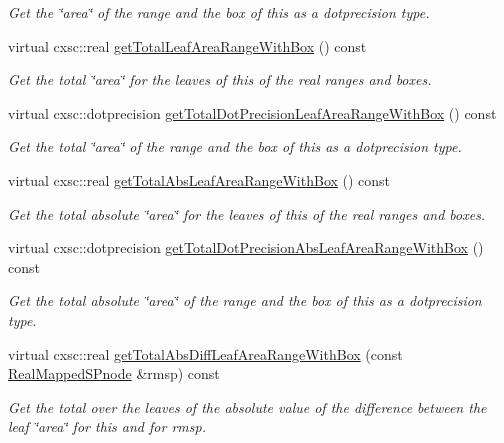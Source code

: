 \begin{DoxyCompactItemize}
\begin{DoxyCompactList}\small\item\em \-Get the \char`\"{}area\char`\"{} of the range and the box of this as a dotprecision type. \end{DoxyCompactList}\item 
virtual cxsc\-::real \hyperlink{classsubpavings_1_1RealMappedSPnode_a23ef95e66b4b920f205739d9cf42f96f}{get\-Total\-Leaf\-Area\-Range\-With\-Box} () const 
\begin{DoxyCompactList}\small\item\em \-Get the total \char`\"{}area\char`\"{} for the leaves of this of the real ranges and boxes. \end{DoxyCompactList}\item 
virtual cxsc\-::dotprecision \hyperlink{classsubpavings_1_1RealMappedSPnode_a4f769639fd1e13ea5449bb12dc53c998}{get\-Total\-Dot\-Precision\-Leaf\-Area\-Range\-With\-Box} () const 
\begin{DoxyCompactList}\small\item\em \-Get the total \char`\"{}area\char`\"{} of the range and the box of this as a dotprecision type. \end{DoxyCompactList}\item 
virtual cxsc\-::real \hyperlink{classsubpavings_1_1RealMappedSPnode_a972c5dbc0bedd9cad3af4f2af43be277}{get\-Total\-Abs\-Leaf\-Area\-Range\-With\-Box} () const 
\begin{DoxyCompactList}\small\item\em \-Get the total absolute \char`\"{}area\char`\"{} for the leaves of this of the real ranges and boxes. \end{DoxyCompactList}\item 
virtual cxsc\-::dotprecision \hyperlink{classsubpavings_1_1RealMappedSPnode_a2901c49d51615810f146a38ccb503fda}{get\-Total\-Dot\-Precision\-Abs\-Leaf\-Area\-Range\-With\-Box} () const 
\begin{DoxyCompactList}\small\item\em \-Get the total absolute \char`\"{}area\char`\"{} of the range and the box of this as a dotprecision type. \end{DoxyCompactList}\item 
virtual cxsc\-::real \hyperlink{classsubpavings_1_1RealMappedSPnode_a0660b7981cce44ca09c2e0d68a6c1a21}{get\-Total\-Abs\-Diff\-Leaf\-Area\-Range\-With\-Box} (const \hyperlink{classsubpavings_1_1RealMappedSPnode}{\-Real\-Mapped\-S\-Pnode} \&rmsp) const 
\begin{DoxyCompactList}\small\item\em \-Get the total over the leaves of the absolute value of the difference between the leaf \char`\"{}area\char`\"{} for this and for {\itshape rmsp\/}. \end{DoxyCompactList}\item 

\end{DoxyCompactItemize}
